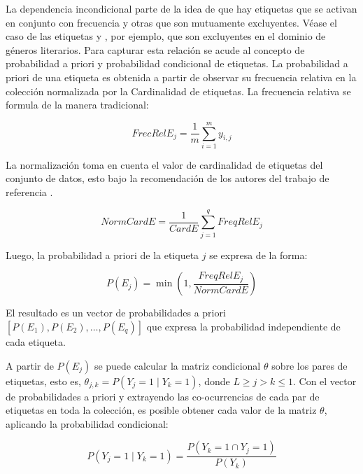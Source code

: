 La dependencia incondicional parte de la idea de que hay etiquetas que se
activan en conjunto con frecuencia y otras que son mutuamente excluyentes. Véase
el caso de las etiquetas  y , por ejemplo, que son excluyentes en el dominio de géneros literarios.
Para capturar esta relación se acude al concepto de probabilidad a priori y
probabilidad condicional de etiquetas. La probabilidad a priori de una etiqueta
es obtenida a partir de observar su frecuencia relativa en la colección
normalizada por la Cardinalidad de etiquetas.  La frecuencia relativa se formula de la manera tradicional:

\begin{equation}
	FrecRelE_{j} = \frac{1}{m} \sum_{i=1}^{m} y_{i,j}
\end{equation}

La normalización toma en cuenta el valor de cardinalidad de etiquetas del
conjunto de datos, esto bajo la recomendación de los autores del trabajo de
referencia \cite{read_scalable_2012}.

\begin{equation}
	NormCardE = \frac{1}{CardE} \sum_{j=1}^{q} FreqRelE_{j}
\end{equation}

Luego, la probabilidad a priori de la etiqueta $j$ se expresa de la forma:

\begin{equation}
	P(E_{j}) =\min{(1, \frac{FreqRelE_{j}}{NormCardE})}
\end{equation}

El resultado es un vector de probabilidades a priori $[P(E_{1}),
			P(E_{2}),\dots, P(E_{q})]$ que expresa la probabilidad independiente de cada
etiqueta.

A partir de $P(E_{j})$ se puede calcular la matriz condicional $\theta$ sobre
los pares de etiquetas, esto es, $\theta_{j,k} = P(Y_{j} = 1 \mid Y_{k} = 1)$,
donde $L \geq j > k \leq 1$.  Con el vector de probabilidades a priori y extrayendo las
co-ocurrencias de cada par de etiquetas en toda la colección, es posible obtener
cada valor de la matriz $\theta$, aplicando la probabilidad condicional:

\begin{equation}
	P(Y_{j} = 1 \mid Y_{k} = 1) = \frac{P(Y_{k} = 1 \cap Y_{j} = 1)}{P(Y_{k})}
\end{equation}

